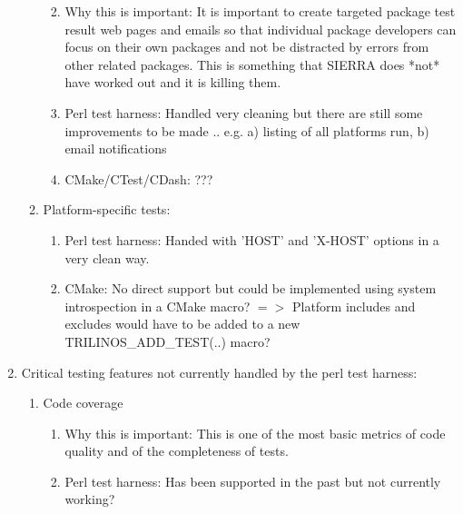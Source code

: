 \documentclass[pdf,ps2pdf,11pt]{SANDreport}
\begin{document}
\begin{enumerate}
\begin{enumerate}
\begin{enumerate}
    {}\item Why this is important: It is important to create targeted
    package test result web pages and emails so that individual
    package developers can focus on their own packages and not be
    distracted by errors from other related packages.  This is
    something that SIERRA does *not* have worked out and it is killing
    them.

    {}\item Perl test harness: Handled very cleaning but there are
    still some improvements to be made .. e.g. a) listing of all
    platforms run, b) email notifications

    {}\item CMake/CTest/CDash: ???

    \end{enumerate}

  {}\item Platform-specific tests:

    \begin{enumerate}

    {}\item Perl test harness: Handed with 'HOST' and 'X-HOST' options
    in a very clean way.

    {}\item CMake: No direct support but could be implemented using
    system introspection in a CMake macro?  $=>$ Platform includes and
    excludes would have to be added to a new TRILINOS\_ADD\_TEST(..) 
    macro?

    \end{enumerate}

  \end{enumerate}

{}\item Critical testing features not currently handled by the perl
test harness:

  \begin{enumerate}

  {}\item Code coverage

    \begin{enumerate}

    {}\item Why this is important: This is one of the most basic
    metrics of code quality and of the completeness of tests.

    {}\item Perl test harness: Has been supported in the past but not
    currently working?


\end{enumerate}
\end{enumerate}
\end{enumerate}
\end{document}
